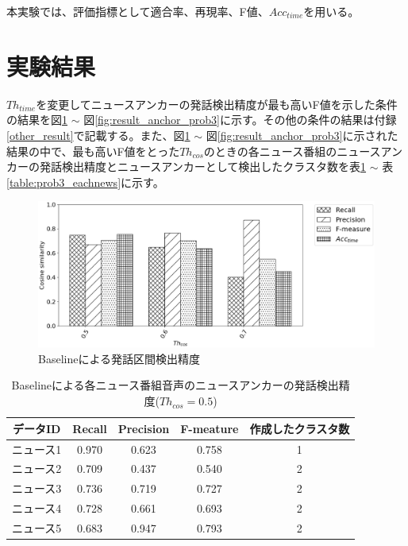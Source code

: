 本実験では、評価指標として適合率、再現率、F値、$Acc_{time}$を用いる。

\section{実験結果}
$Th_{time}$を変更してニュースアンカーの発話検出精度が最も高いF値を示した条件の結果を図\ref{fig:result_anchor_baseline} $\sim$ 図\ref{fig:result_anchor_prob3}に示す。その他の条件の結果は付録\ref{other_result}で記載する。また、図\ref{fig:result_anchor_baseline} $\sim$ 図\ref{fig:result_anchor_prob3}に示された結果の中で、最も高いF値をとった$Th_{cos}$のときの各ニュース番組のニュースアンカーの発話検出精度とニュースアンカーとして検出したクラスタ数を表\ref{table:baseline_eachnews} $\sim$ 表\ref{table:prob3_eachnews}に示す。

\begin{figure}[H]
  \begin{center}
    \includegraphics[scale=0.5]{./figure/baseline.eps}
  \end{center}
  \caption{Baselineによる発話区間検出精度 \label{fig:result_anchor_baseline}}
\end{figure}

\begin{table}[H]
  \begin{center}
    \caption{Baselineによる各ニュース番組音声のニュースアンカーの発話検出精度($Th_{cos}=0.5$) \label{table:baseline_eachnews}}
    \begin{tabular}{|c||c|c|c|c|} \hline
データID & Recall & Precision & F-meature & 作成したクラスタ数\\ \hline
ニュース1 & 0.970 & 0.623 & 0.758 & 1 \\ \hline
ニュース2 & 0.709 & 0.437 & 0.540 & 2 \\ \hline
ニュース3 & 0.736 & 0.719 & 0.727 & 2 \\ \hline
ニュース4 & 0.728 & 0.661 & 0.693 & 2 \\ \hline
ニュース5 & 0.683 & 0.947 & 0.793 & 2 \\ \hline
    \end{tabular}
  \end{center}
\end{table}

